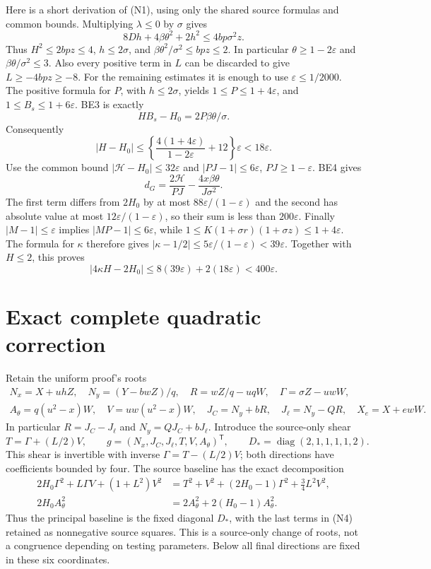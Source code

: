 \documentclass[11pt]{article}
\newcommand{\eps}{\varepsilon}
\begin{document}
Here is a short derivation of (N1), using only the shared source
formulas and common bounds. Multiplying $\lambda\le0$ by $\sigma$
gives
\[
 8Dh+4\beta\theta^2+2h^2\le4bp\sigma^2z.
\]
Thus $H^2\le2bpz\le4$, $h\le2\sigma$, and
$\beta\theta^2/\sigma^2\le bpz\le2$. In particular
$\theta\ge1-2\eps$ and $\beta\theta/\sigma^2\le3$.
Also every positive term in $L$ can be discarded to give
$L\ge-4bpz\ge-8$.
For the remaining estimates it is enough to use $\eps\le1/2000$.
The positive formula for $P$, with $h\le2\sigma$, yields
$1\le P\le1+4\eps$, and $1\le B_s\le1+6\eps$.
BE3 is exactly
\[
 HB_s-H_0=2P\beta\theta/\sigma.
\]
Consequently
\[
 |H-H_0|\le
 \left\{\frac{4(1+4\eps)}{1-2\eps}+12\right\}\eps
 <18\eps.
\]
Use the common bound $|\mathcal H-H_0|\le32\eps$ and
$|PJ-1|\le6\eps$, $PJ\ge1-\eps$. BE4 gives
\[
 d_G=\frac{2\mathcal H}{PJ}
             -\frac{4x\beta\theta}{J\sigma^2}.
\]
The first term differs from $2H_0$ by at most
$88\eps/(1-\eps)$ and the second has absolute value at most
$12\eps/(1-\eps)$, so their sum is less than $200\eps$.
Finally $|M-1|\le\eps$ implies $|MP-1|\le6\eps$, while
$1\le K(1+\sigma r)(1+\sigma z)\le1+4\eps$.
The formula for $\kappa$ therefore gives
$|\kappa-1/2|\le5\eps/(1-\eps)<39\eps$.
Together with $H\le2$, this proves
\[
 |4\kappa H-2H_0|
 \le8(39\eps)+2(18\eps)<400\eps.
\]

\section{Exact complete quadratic correction}

Retain the uniform proof's roots
\[
\begin{gathered}
 N_x=X+uhZ,\quad N_y=(Y-bwZ)/q,\quad
 R=wZ/q-uqW,\quad \Gamma=\sigma Z-uwW,\\
 A_\theta=q(u^2-x)W,\quad V=uw(u^2-x)W,\quad
 J_C=N_y+bR,\quad J_\ell=N_y-QR,\quad X_e=X+ewW.
\end{gathered}
\]
In particular $R=J_C-J_\ell$ and $N_y=QJ_C+bJ_\ell$.
Introduce the source-only shear
\[
 T=\Gamma+(L/2)V,\qquad
 g=(N_x,J_C,J_\ell,T,V,A_\theta)^{\mathsf T},\qquad
 D_* =\operatorname{diag}(2,1,1,1,1,2).
\]
This shear is invertible with inverse $\Gamma=T-(L/2)V$;
both directions have coefficients bounded by four.
The source baseline has the exact decomposition
\[
\begin{split}
 2H_0\Gamma^2+L\Gamma V+(1+L^2)V^2
 &=T^2+V^2+(2H_0-1)\Gamma^2+\tfrac34L^2V^2,\\
 2H_0A_\theta^2&=2A_\theta^2+2(H_0-1)A_\theta^2.
\end{split}                                                   \tag{N4}
\]
Thus the principal baseline is the fixed diagonal $D_*$, with the
last terms in (N4) retained as nonnegative source squares. This is
a source-only change of roots, not a congruence depending on testing
parameters. Below all final directions are fixed in these six coordinates.
\end{document}
